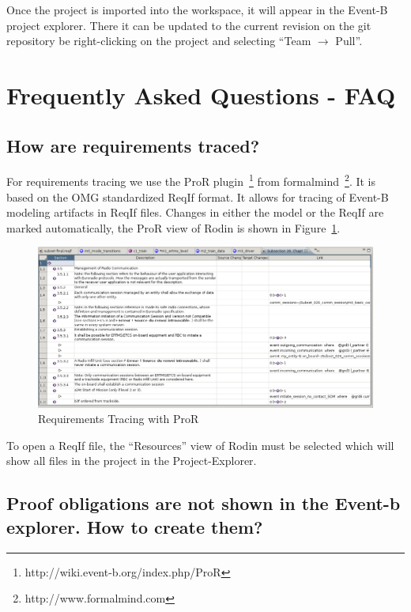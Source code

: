 \documentclass{template/openetcs_article}
\begin{document}
Once the project is imported into the workspace, it will appear in the Event-B
project explorer. There it can be updated to the current revision on the git
repository be right-clicking on the project and selecting ``Team $\rightarrow$
Pull''. 

\section{Frequently Asked Questions - FAQ}
\label{sec:faq}

\subsection{How are requirements traced?}
\label{sec:how-are-requirements}

For requirements tracing we use the ProR
plugin~\footnote{http://wiki.event-b.org/index.php/ProR} from
formalmind~\footnote{http://www.formalmind.com}. It is based on the OMG
standardized ReqIf format. It allows for tracing of Event-B modeling artifacts
in ReqIf files. Changes in either the model or the ReqIf are marked
automatically, the ProR view of Rodin is shown in Figure~\ref{fig:req-tracing}.


\begin{figure}[H]
  \centering
  \includegraphics[width=\textwidth]{ReqIfinRodin}
  \caption{Requirements Tracing with ProR}
  \label{fig:req-tracing}
\end{figure}

To open a ReqIf file, the ``Resources'' view of Rodin must be selected which
will show all files in the project in the Project-Explorer.

\subsection{Proof obligations are not shown in the Event-b explorer. How to
  create them?}
\label{sec:proof-oblig-are}
\end{document}
